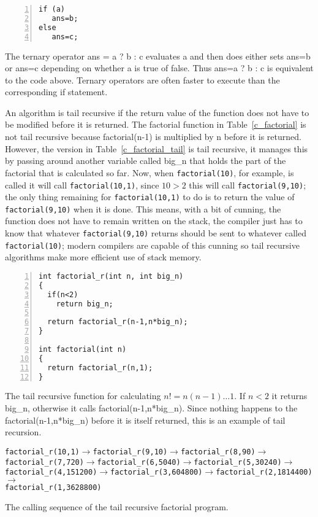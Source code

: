 \documentclass[11pt,a4paper]{scrartcl}
\begin{document}
\begin{table}
\begin{lstlisting}[numbers=left]
if (a)
   ans=b;
else 
   ans=c;
\end{lstlisting}
\caption{The ternary operator ans = a ? b : c evaluates a and then
  does either sets ans=b or ans=c depending on whether a is true of
  false.  Thus ans=a ? b : c is equivalent to the code above. Ternary
  operators are often faster to execute than the corresponding if
  statement.\label{c_ternary}}
\end{table}
 
An algorithm is tail recursive if the return value of the function
does not have to be modified before it is returned. The factorial
function in Table~\ref{c_factorial} is not tail recursive because
factorial(n-1) is multiplied by n before it is returned. However, the
version in Table~\ref{c_factorial_tail} is tail recursive, it manages
this by passing around another variable called big\_n that holds the
part of the factorial that is calculated so far. Now, when
\texttt{factorial(10)}, for example, is called it will call
\texttt{factorial(10,1)}, since $10>2$ this will call
\texttt{factorial(9,10)}; the only thing remaining for
\texttt{factorial(10,1)} to do is to return the value of
\texttt{factorial(9,10)} when it is done. This means, with a bit of
cunning, the function does not have to remain written on the stack,
the compiler just has to know that whatever \texttt{factorial(9,10)}
returns should be sent to whatever called \texttt{factorial(10)};
modern compilers are capable of this cunning so tail recursive
algorithms make more efficient use of stack memory.

\begin{table}
\begin{lstlisting}[numbers=left]
int factorial_r(int n, int big_n)
{
  if(n<2)
    return big_n;

  return factorial_r(n-1,n*big_n);
}

int factorial(int n)
{
  return factorial_r(n,1);
}
\end{lstlisting}
\caption{The tail recursive function for calculating $n!=n(n-1)\ldots
  1$. If $n<2$ it returns big\_n, otherwise it calls
  factorial(n-1,n*big\_n). Since nothing happens to the
  factorial(n-1,n*big\_n) before it is itself returned, this is an
  example of tail recursion.\label{c_factorial_tail}}
\end{table}

\begin{table}
\texttt{factorial\_r(10,1)}$\rightarrow$\texttt{factorial\_r(9,10)}$\rightarrow$\texttt{factorial\_r(8,90)}$\rightarrow$\\
\texttt{factorial\_r(7,720)}$\rightarrow$\texttt{factorial\_r(6,5040)}$\rightarrow$\texttt{factorial\_r(5,30240)}$\rightarrow$\\
\texttt{factorial\_r(4,151200)}$\rightarrow$\texttt{factorial\_r(3,604800)}$\rightarrow$\texttt{factorial\_r(2,1814400)}$\rightarrow$\\
\texttt{factorial\_r(1,3628800)}
\caption{The calling sequence of the tail recursive factorial program.\label{calling}}
\end{table}
\end{document}
